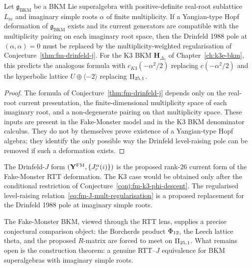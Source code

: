 \begin{conjecture}
\label{cor:fm-drinfeld-j-existence}
\ClaimStatusConjectured
{}
Let $\mathfrak{g}_{\mathrm{BKM}}$ be a BKM Lie superalgebra with positive-definite real-root sublattice $L_{\mathrm{re}}$ and imaginary simple roots $\alpha$ of finite multiplicity. If a Yangian-type Hopf deformation of $\mathfrak{g}_{\mathrm{BKM}}$ exists and its current generators are compatible with the multiplicity pairing on each imaginary root space, then the Drinfeld 1988 pole at $(\alpha,\alpha)=0$ must be replaced by the multiplicity-weighted regularisation of Conjecture~\ref{thm:fm-drinfeld-j}. For the K3 BKM $\mathbf{H}_{\Delta_5}$ of Chapter~\ref{ch:k3e-bkm}, this predicts the analogous formula with $c_{K3}(-\alpha^2/2)$ replacing $c(-\alpha^2/2)$ and the hyperbolic lattice $U \oplus \langle -2 \rangle$ replacing $\mathrm{II}_{25,1}$.
\end{conjecture}

\begin{proof}
The formula of Conjecture~\ref{thm:fm-drinfeld-j} depends only on the real-root current presentation, the finite-dimensional multiplicity space of each imaginary root, and a non-degenerate pairing on that multiplicity space. These inputs are present in the Fake-Monster model and in the K3 BKM denominator calculus. They do not by themselves prove existence of a Yangian-type Hopf algebra; they identify the only possible way the Drinfeld level-raising pole can be removed if such a deformation exists.
\end{proof}

The Drinfeld-$J$ form $(\mathbf{Y}^{\mathrm{FM}}, \{J^\alpha_r(i)\})$ is the proposed
rank-$26$ current form of the Fake-Monster RTT deformation. The K3 case
would be obtained only after the conditional restriction of
Conjecture~\ref{conj:fm-k3-phi-descent}. The regularised
level-raising relation~\eqref{eq:fm-J-mult-regularisation} is a proposed
replacement for the Drinfeld 1988 pole at imaginary simple roots.

The Fake-Monster BKM, viewed through the RTT lens, supplies a precise conjectural comparison object: the Borcherds product $\Phi_{12}$, the Leech lattice theta, and the proposed $R$-matrix are forced to meet on $\mathrm{II}_{25,1}$. What remains open is the construction theorem: a genuine RTT--$J$ equivalence for BKM superalgebras with imaginary simple roots.
